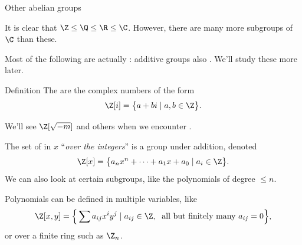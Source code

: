 \documentclass[8pt,handout]{beamer}
\newcommand{\Pause}{}      %
\begin{document}
\begin{frame}{Other abelian groups}
  
  It is clear that $\Z\leq\Q\leq\R\leq\C$. \Pause However, there are
  many more subgroups of $\C$ than these. \medskip\Pause

  Most of the following are actually : additive groups
  also . We'll study
  these more later. \smallskip\pause
  
  \begin{block}{Definition}
  The  are the complex numbers of the form
  \[
  \Z[i]=\big\{a+bi\mid a,b\in\Z\big\}.
  \]
  \end{block}

  \smallskip\Pause
  
  We'll see $\Z[\sqrt{-m}]$ and others when we encounter .  \medskip\pause

  The set of  in $x$ ``\emph{over the integers}'' is a
  group under addition, denoted
  \[
  \Z[x]=\big\{a_nx^n+\cdots+a_1x+a_0\mid a_i\in\Z\big\}.
  \]
  \Pause We can also look at certain subgroups, like the polynomials of degree
  $\leq n$.

  \medskip\pause
  
  Polynomials can be defined in multiple variables, like
  \[
  \Z[x,y]=\Big\{\sum a_{ij}x^iy^j\mid a_{ij}\in\Z,\;\text{ all but
    finitely many $a_{ij}=0$}\Big\},
  \]
  or over a finite ring such as $\Z_n$.
  
\end{frame}

\end{document}

